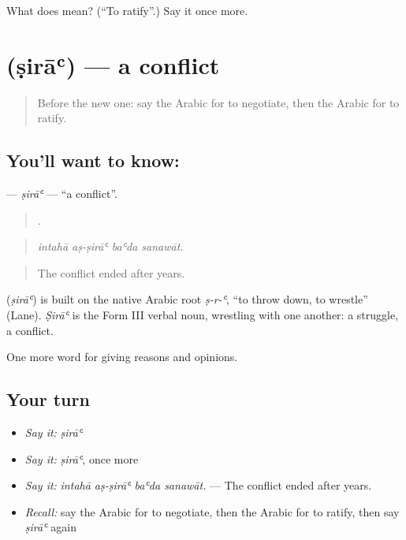 \begin{tcolorbox}[breakable,colback=teal!4,colframe=teal!35!black,title={Before you move on}]
What does  mean? (\textquotedblleft{}To ratify\textquotedblright{}.) Say it once more.
\end{tcolorbox}
\section[\texorpdfstring{\ar{صراع} (ṣirāʿ)}{صراع (ṣirāʿ)}]{ (ṣirāʿ) — a conflict}

\label{lesson:AR-C386-sira}



\begin{quote}
Before the new one: say the Arabic for to negotiate, then the Arabic for to ratify.
\end{quote}

\subsection*{You'll want to know: }
\textbf{} — \emph{ṣirāʿ} — \textquotedblleft{}a conflict\textquotedblright{}.

\begin{quote}
   .
\end{quote}

\begin{quote}
\emph{intahā aṣ-ṣirāʿ baʿda sanawāt.}
\end{quote}

\begin{quote}
The conflict ended after years.
\end{quote}

\begin{cousinweb}
\textbf{} (\emph{ṣirāʿ}) is built on the native Arabic root \emph{ṣ-r-ʿ}, \textquotedblleft{}to throw down, to wrestle\textquotedblright{} (Lane). \emph{Ṣirāʿ} is the Form III verbal noun, wrestling with one another: a struggle, a conflict.
\end{cousinweb}

\begin{grammarlens}[title={What you've built}]
One more word for giving reasons and opinions.
\end{grammarlens}

\subsection*{Your turn}
\begin{itemize}
\raggedright
  \item \emph{Say it:} \emph{ṣirāʿ}
  \item \emph{Say it:} \emph{ṣirāʿ}, once more
  \item \emph{Say it:} \emph{intahā aṣ-ṣirāʿ baʿda sanawāt.} — The conflict ended after years.
  \item \emph{Recall:} say the Arabic for to negotiate, then the Arabic for to ratify, then say \emph{ṣirāʿ} again
\end{itemize}

